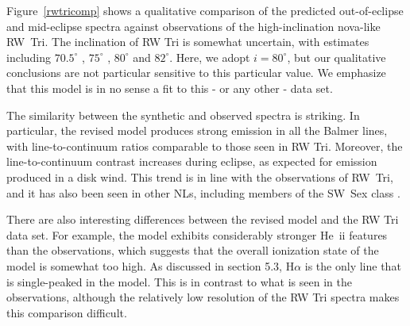 \documentclass[preprint, a4paper, 11pt]{aastex}
\begin{document}
Figure~\ref{rwtricomp} shows a qualitative comparison of the predicted
out-of-eclipse and mid-eclipse spectra against observations of the
high-inclination nova-like RW~Tri. The inclination of RW Tri is
somewhat uncertain, with estimates including $70.5^\circ$
\citep{smak1995}, $75^\circ$ \citep{groot2004}, $80^\circ$
\citep{longmore1981} and $82^\circ$\citep{frankking1981}. Here, we
adopt $i = 80^\circ$, but our qualitative conclusions are not
particular sensitive to this particular value. We emphasize that this
model is in no sense a fit to this - or any other - data set.


The similarity between the synthetic and observed spectra is
striking. In particular, the revised model produces strong emission in
all the Balmer lines, with line-to-continuum ratios comparable to
those seen in RW Tri. Moreover, the line-to-continuum contrast
increases during eclipse, as expected for emission produced in a disk
wind. This trend is in line with the observations of RW~Tri, and it
has also been seen in other NLs, including members of the SW~Sex class
\citep{neustroev2011}.

There are also interesting differences between the revised
model and the RW Tri data set. For example, the model exhibits
considerably stronger He~{\sc ii} features than the observations,
which suggests that the overall ionization state of the model is
somewhat too high. 
As discussed in section 5.3, H$\alpha$ is the only line
that is single-peaked in the model. This is
in contrast to what is seen in the observations,
although the relatively low resolution of the RW Tri
spectra makes this comparison difficult.
\end{document}
